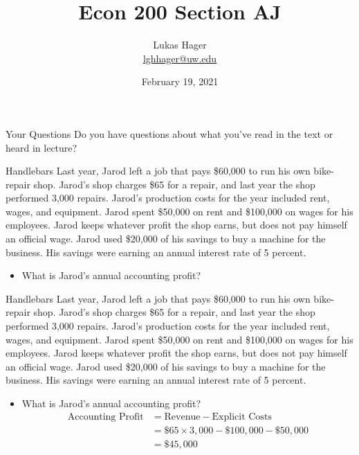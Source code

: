 \documentclass{beamer}
\title{Econ 200 Section AJ}
\author{Lukas Hager \\ \href{mailto:lghhager@uw.edu}{lghhager@uw.edu}}
\institute{Office Hours: Monday 8-9, Thursday 3:30-4:30}
\date{February 19, 2021}
\begin{document}
\begin{frame}
  \titlepage
\end{frame}


\begin{frame}{Your Questions}
    Do you have questions about what you've read in the text or heard in lecture?
\end{frame}

\begin{frame}[t]{Handlebars}
    Last year, Jarod left a job that pays \$60,000 to run his own bike-repair shop. Jarod’s shop charges \$65 for a repair, and last year the shop performed 3,000 repairs. Jarod’s production costs for the year included rent, wages, and equipment. Jarod spent \$50,000 on rent and \$100,000 on wages for his employees. Jarod keeps whatever profit the shop earns, but does not pay himself an official wage. Jarod used \$20,000 of his savings to buy a machine for the business. His savings were earning an annual interest rate of 5 percent.
    \begin{itemize}
        \item What is Jarod's annual accounting profit?
    \end{itemize}
\end{frame}

\begin{frame}[t]{Handlebars}
    Last year, Jarod left a job that pays \$60,000 to run his own bike-repair shop. Jarod’s shop charges \$65 for a repair, and last year the shop performed 3,000 repairs. Jarod’s production costs for the year included rent, wages, and equipment. Jarod spent \$50,000 on rent and \$100,000 on wages for his employees. Jarod keeps whatever profit the shop earns, but does not pay himself an official wage. Jarod used \$20,000 of his savings to buy a machine for the business. His savings were earning an annual interest rate of 5 percent.
    \begin{itemize}
        \item What is Jarod's annual accounting profit?
        \[\begin{split}
            \text{Accounting Profit} &= \text{Revenue} - \text{Explicit Costs} \\
            &=\$65 \times 3,000 - \$100,000 - \$50,000 \\
            &= \$45,000
        \end{split}\]
    \end{itemize}
\end{frame}
\end{document}

